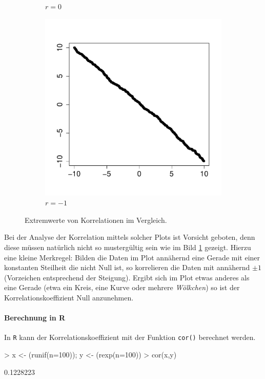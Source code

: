 \begin{figure}[h!]
\begin{subfigure}[b]{0.3\textwidth}
\caption{$r=0$}
\end{subfigure}
\begin{subfigure}[b]{0.3\textwidth}
\includegraphics{begriffe-017}
\caption{$r=-1$}
\end{subfigure}
\caption{Extremwerte von Korrelationen im Vergleich.}
\label{fig:korrelation}
\end{figure}

\noindent
Bei der Analyse der Korrelation mittels solcher Plots ist Vorsicht
geboten, denn diese müssen natürlich nicht so mustergültig sein wie im 
Bild \ref{fig:korrelation} gezeigt. 
Hierzu eine kleine Merkregel: Bilden die
Daten im Plot annähernd eine Gerade mit
einer konstanten Steilheit die nicht Null ist, so korrelieren die Daten
mit annähernd $\pm1$ (Vorzeichen entsprechend der Steigung).
Ergibt sich im Plot etwas anderes als eine Gerade (etwa ein Kreis, eine
Kurve oder mehrere \emph{Wölkchen}) so ist der Korrelationskoeffizient
Null anzunehmen.

\paragraph{Berechnung in R}
In \lstinline{R} kann der Korrelationskoeffizient mit der Funktion
\lstinline{cor()} berechnet werden.

\begin{Schunk}
\begin{Sinput}
> x <- (runif(n=100)); y <- (rexp(n=100))
> cor(x,y)
\end{Sinput}
\begin{Soutput}
[1] 0.1228223
\end{Soutput}
\end{Schunk}
